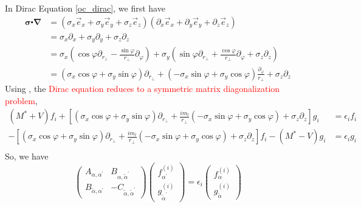 In Dirac Equation \eqref{oc_dirac}, we first have
\begin{equation}
\begin{aligned}
  \boldsymbol{\sigma} \centerdot \boldsymbol{\nabla} &= (\sigma_x \vec{e}_x + \sigma_y \vec{e}_y + \sigma_z\vec{e}_z )(\partial_x\vec{e}_x + \partial_y \vec{e}_y + \partial_z\vec{e}_z ) \\
  &= \sigma_x\partial_x + \sigma_y\partial_y + \sigma_z\partial_z \\
  &= \sigma_x\left( \cos\varphi \partial_{r_{\perp}} - \frac{\sin\varphi}{r_{\perp}} \partial_{\varphi}  \right) + \sigma_y\left( \sin\varphi\partial_{r_{\perp}} + \frac{\cos\varphi}{r_{\perp}}\partial_{\varphi} + \sigma_z\partial_z \right) \\
  &= (\sigma_x\cos\varphi + \sigma_y\sin\varphi) \partial_{r_{\perp}} + (-\sigma_x\sin\varphi + \sigma_y\cos\varphi)\frac{\partial_{\varphi}}{r_{\perp}} + \sigma_z\partial_z
\end{aligned}
\end{equation}
Using , the \textcolor{red}{Dirac equation reduces to a symmetric matrix diagonalization problem}, 
\begin{equation}
\begin{aligned}
  (M^* + V)f_i + \left[ (\sigma_x\cos\varphi + \sigma_y\sin\varphi)\partial_{r_{\perp}} + \frac{im_l}{r_{\perp}}(-\sigma_x\sin\varphi + \sigma_y\cos\varphi) + \sigma_z\partial_z \right] g_i &= \epsilon_i f_i \\
  -\left[ (\sigma_x\cos\varphi + \sigma_y\sin\varphi)\partial_{r_{\perp}} + \frac{im_l}{r_{\perp}}(-\sigma_x\sin\varphi + \sigma_y\cos\varphi) + \sigma_z\partial_z \right] f_i - (M^* - V)g_i &= \epsilon_i g_i \\
\end{aligned}
\end{equation}
So, we have
\begin{equation}
\left(\begin{array}{cc}
  A_{\alpha, \alpha^{\prime}}         & B_{\alpha, \tilde{\alpha}^{\prime}} \\
  B_{\tilde{\alpha}, \alpha^{\prime}} & -C_{\tilde{\alpha}, \tilde{\alpha}^{\prime}}
  \end{array}\right)
  \left(\begin{array}{l}
    f_{\alpha^{\prime}}^{(i)} \\
    g_{\tilde{\alpha}^{\prime}}^{(i)}
  \end{array}\right)
  =\epsilon_{i}
  \left(\begin{array}{c}
    f_{\alpha}^{(i)} \\
    g_{\tilde{\alpha}}^{(i)}
  \end{array}\right)
\end{equation}

